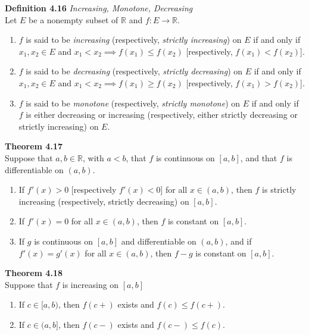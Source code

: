 \documentclass[8pt,landscape]{article}
\begin{document}
\begin{multicols}{3}
    \textbf{Definition 4.16} \emph{Increasing, Monotone, Decreasing} \\
    Let $E$ be a nonempty subset of $\mathbb{R}$ and $f : E \to \mathbb{R}$.
    \begin{enumerate}
        \item $f$ is said to be \emph{increasing}
            (respectively, \emph{strictly increasing}) on $E$ if and only if
            $x_1, x_2 \in E$ and $x_1 < x_2 \implies f(x_1) \leq f(x_2)$
            [respectively, $f(x_1) < f(x_2)$].
        \item $f$ is said to be \emph{decreasing}
            (respectively, \emph{strictly decreasing}) on $E$ if and only if
            $x_1, x_2 \in E$ and $x_1 < x_2 \implies f(x_1) \geq f(x_2)$
            [respectively, $f(x_1) > f(x_2)$].
        \item $f$ is said to be \emph{monotone} (respectively, \emph{strictly monotone})
            on $E$ if and only if $f$ is either decreasing or increasing
            (respectively, either strictly decreasing or strictly increasing) on $E$.
    \end{enumerate}

    \textbf{Theorem 4.17} \\
    Suppose that $a, b \in \mathbb{R}$, with $a<b$, that $f$ is continuous on $[a, b]$,
    and that $f$ is differentiable on $(a, b)$.
    \begin{enumerate}
        \item If $f'(x) > 0$ [respectively $f'(x) < 0$] for all $x \in (a, b)$,
            then $f$ is strictly increasing (respectively, strictly decreasing) on
            $[a, b]$.
        \item If $f'(x) = 0$ for all $x \in (a, b)$, then $f$ is constant on $[a, b]$.
        \item If $g$ is continuous on $[a, b]$ and differentiable on $(a, b)$,
            and if $f'(x) = g'(x)$ for all $x \in (a, b)$, then $f-g$ is constant on
            $[a, b]$.
    \end{enumerate}

    \textbf{Theorem 4.18} \\
    Suppose that $f$ is increasing on $[a, b]$
    \begin{enumerate}
        \item If $c \in [a, b)$, then $f(c+)$ exists and $f(c) \leq f(c+)$.
        \item If $c \in (a, b]$, then $f(c-)$ exists and $f(c-) \leq f(c)$.
    \end{enumerate}


\end{multicols}
\end{document}
